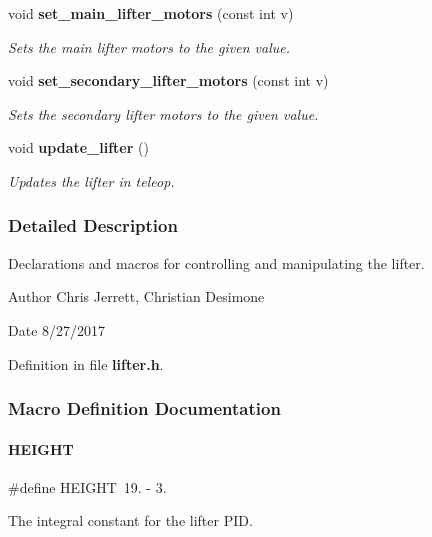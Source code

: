 \begin{DoxyCompactItemize}
void \textbf{ set\+\_\+main\+\_\+lifter\+\_\+motors} (const int v)
\begin{DoxyCompactList}\small\item\em Sets the main lifter motors to the given value. \end{DoxyCompactList}\item 
void \textbf{ set\+\_\+secondary\+\_\+lifter\+\_\+motors} (const int v)
\begin{DoxyCompactList}\small\item\em Sets the secondary lifter motors to the given value. \end{DoxyCompactList}\item 
void \textbf{ update\+\_\+lifter} ()
\begin{DoxyCompactList}\small\item\em Updates the lifter in teleop. \end{DoxyCompactList}\end{DoxyCompactItemize}


\subsubsection{Detailed Description}
Declarations and macros for controlling and manipulating the lifter. 

\begin{DoxyAuthor}{Author}
Chris Jerrett, Christian Desimone 
\end{DoxyAuthor}
\begin{DoxyDate}{Date}
8/27/2017 
\end{DoxyDate}


Definition in file \textbf{ lifter.\+h}.



\subsubsection{Macro Definition Documentation}
\mbox{\label{lifter_8h_aed89bd71aee8be823e8a20ec4e093c1e}} 
\paragraph{H\+E\+I\+G\+HT}
{\footnotesize\ttfamily \#define H\+E\+I\+G\+HT~19. -\/ 3.}



The integral constant for the lifter P\+ID. 




